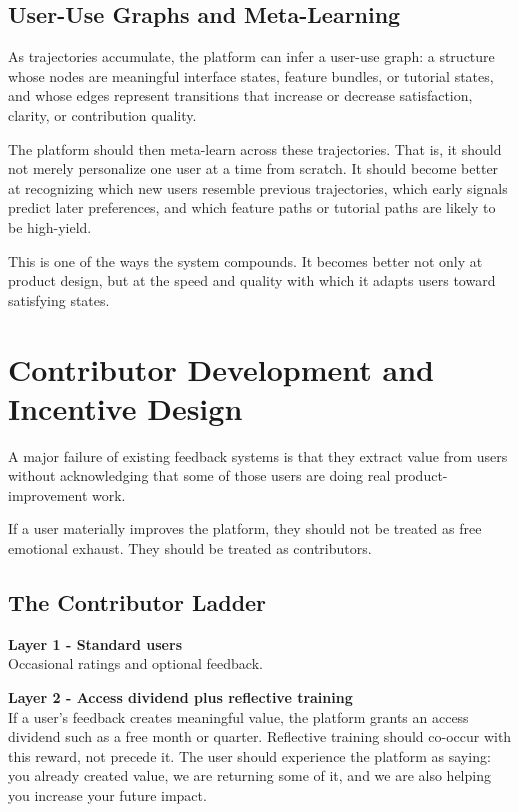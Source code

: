 \documentclass[11pt]{article}
\begin{document}
\subsection{User-Use Graphs and Meta-Learning}

As trajectories accumulate, the platform can infer a user-use graph: a structure whose nodes are meaningful interface states, feature bundles, or tutorial states, and whose edges represent transitions that increase or decrease satisfaction, clarity, or contribution quality.

The platform should then meta-learn across these trajectories. That is, it should not merely personalize one user at a time from scratch. It should become better at recognizing which new users resemble previous trajectories, which early signals predict later preferences, and which feature paths or tutorial paths are likely to be high-yield.

This is one of the ways the system compounds. It becomes better not only at product design, but at the speed and quality with which it adapts users toward satisfying states.

\section{Contributor Development and Incentive Design}

A major failure of existing feedback systems is that they extract value from users without acknowledging that some of those users are doing real product-improvement work.

If a user materially improves the platform, they should not be treated as free emotional exhaust. They should be treated as contributors.

\subsection{The Contributor Ladder}

\textbf{Layer 1 - Standard users}\\
Occasional ratings and optional feedback.

\textbf{Layer 2 - Access dividend plus reflective training}\\
If a user's feedback creates meaningful value, the platform grants an access dividend such as a free month or quarter. Reflective training should co-occur with this reward, not precede it. The user should experience the platform as saying: you already created value, we are returning some of it, and we are also helping you increase your future impact.
\end{document}

